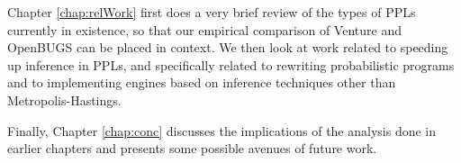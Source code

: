 Chapter \ref{chap:relWork} first does a very brief review of the types of PPLs currently in existence, so that our empirical comparison of Venture and OpenBUGS can be placed in context. We then look at work related to speeding up inference in PPLs, and specifically related to rewriting probabilistic programs and to implementing engines based on inference techniques other than Metropolis-Hastings. 

Finally, Chapter \ref{chap:conc} discusses the implications of the analysis done in earlier chapters and presents some possible avenues of future work.
